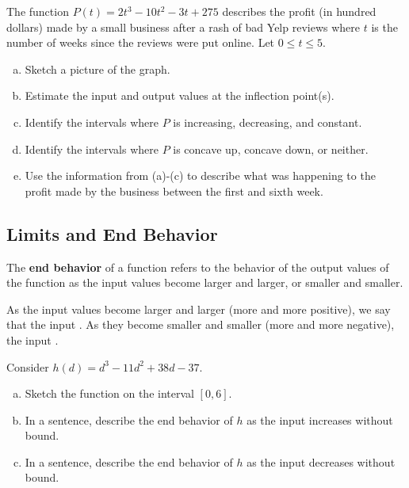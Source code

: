 \documentclass[notes]{subfiles}
\begin{document}
		\begin{ex}
			The function $P(t)=2t^3-10t^2-3t + 275$ describes the profit (in hundred dollars) made by a small business after a rash of bad Yelp reviews where $t$ is the number of weeks since the reviews were put online. Let $0 \leq t \leq 5$. 
			\begin{enumerate}[(a)]
				\item Sketch a picture of the graph.
				\item Estimate the input and output values at the inflection point(s).
				\item Identify the intervals where $P$ is increasing, decreasing, and constant.
					\newpage
				\item Identify the intervals where $P$ is concave up, concave down, or neither.
				\item Use the information from (a)-(c) to describe what was happening to the profit made by the business between the first and sixth week.
			\end{enumerate}
		\end{ex}
		
	\subsection*{Limits and End Behavior}
		\begin{defn}
			The \textbf{end behavior} of a function refers to the behavior of the output values of the function as the input values become larger and larger, or smaller and smaller.
		\end{defn}
		
		As the input values become larger and larger (more and more positive), we say that the input .  As they become smaller and smaller (more and more negative), the input \showto{st}{\blank{3.5}}.
		
		\begin{ex}
			Consider $h(d) = d^3 - 11d^2 + 38d - 37$.  
			\begin{enumerate}[(a)]
				\item Sketch the function on the interval $[0,6]$.
					\vs{1.5}
					\newpage
				\item In a sentence, describe the end behavior of $h$ as the input increases without bound.
					\vs{1}
				\item In a sentence, describe the end behavior of $h$ as the input decreases without bound.
					\vs{1}
			\end{enumerate}
		\end{ex}
\end{document}
